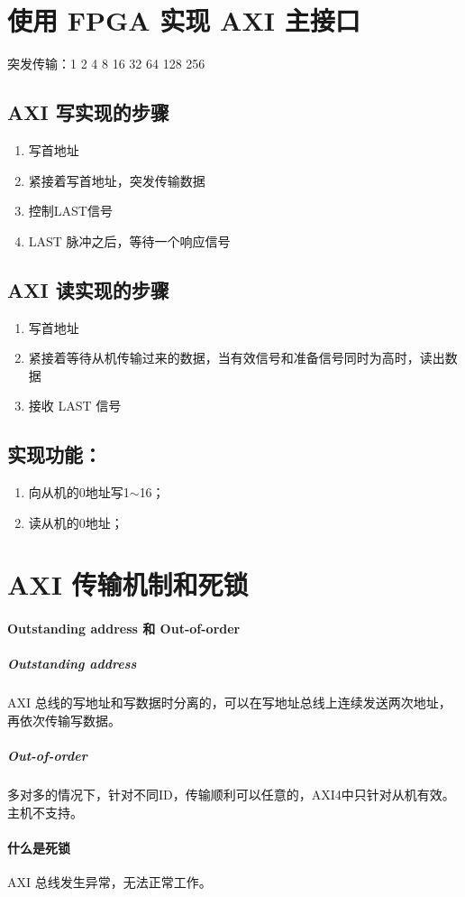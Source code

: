 \section{使用 FPGA 实现 AXI 主接口}
突发传输：1 2 4 8 16 32 64 128 256\par
\subsection{AXI 写实现的步骤}
\begin{enumerate}
    \item 写首地址
    \item 紧接着写首地址，突发传输数据
    \item 控制LAST信号
    \item LAST 脉冲之后，等待一个响应信号
\end{enumerate}
\subsection{AXI 读实现的步骤}
\begin{enumerate}
    \item 写首地址
    \item 紧接着等待从机传输过来的数据，当有效信号和准备信号同时为高时，读出数据
    \item 接收 LAST 信号
\end{enumerate}
\subsection{实现功能：}
\begin{enumerate}
    \item 向从机的0地址写1$\sim$16；
    \item 读从机的0地址；
\end{enumerate}
\section{AXI 传输机制和死锁}
\paragraph{Outstanding address 和 Out-of-order}
\subparagraph{Outstanding address}
AXI 总线的写地址和写数据时分离的，可以在写地址总线上连续发送两次地址，再依次传输写数据。
\subparagraph{Out-of-order}
多对多的情况下，针对不同ID，传输顺利可以任意的，AXI4中只针对从机有效。主机不支持。
\paragraph{什么是死锁}
AXI 总线发生异常，无法正常工作。
